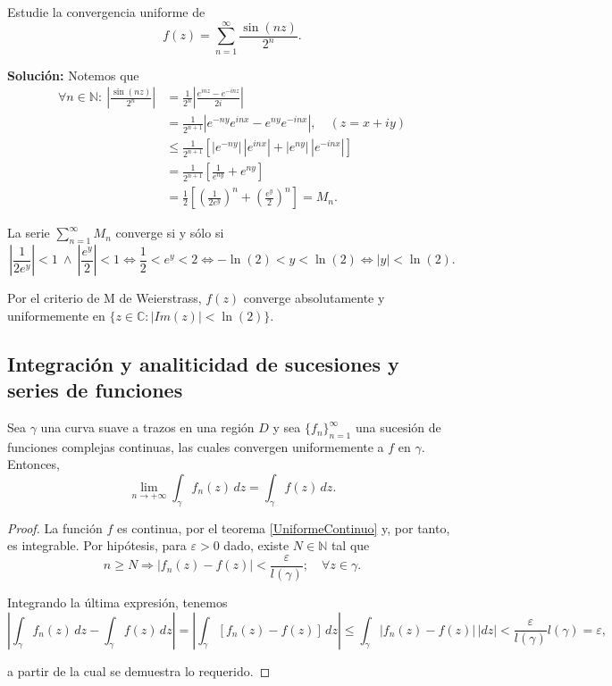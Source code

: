 \begin{ejemplo}
Estudie la convergencia uniforme de 
$$f(z) = \sum_{n=1}^{\infty} \frac{\sin(nz)}{2^n}.$$

\textbf{Solución:} Notemos que
\begin{align*}
    \forall n \in \mathbb{N}: ~ \left|\frac{\sin(nz)}{2^n} \right| &= \frac{1}{2^n} \left| \frac{e^{inz} - e^{-inz}}{2i} \right| \\
    &= \frac{1}{2^{n+1}} \left| e^{-ny} e^{inx} - e^{ny} e^{-inx}\right|, \quad (z = x+iy) \\
    &\leq \frac{1}{2^{n+1}} \left[ |e^{-ny}| \,|e^{inx}| + |e^{ny}| \,|e^{-inx}| \right] \\
    &= \frac{1}{2^{n+1}} \left[ \frac{1}{e^{ny}} + e^{ny} \right] \\
    &= \frac{1}{2} \left[ \left( \frac{1}{2e^{y}}\right)^n +  \left( \frac{e^y}{2}\right)^n \right] = M_n.
\end{align*}

La serie $\sum\limits_{n=1}^{\infty} M_n$ converge si y sólo si
$$\left|\frac{1}{2e^y}\right| < 1 ~\wedge~ \left|\frac{e^y}{2}\right|<1  \Leftrightarrow \frac{1}{2} < e^y < 2 \Leftrightarrow - \ln(2) < y < \ln(2) \Leftrightarrow |y| < \ln(2).$$

Por el criterio de M de Weierstrass, $f(z)$ converge absolutamente y uniformemente en $\{z \in \mathbb{C} : |Im(z)| < \ln(2)\}$.
\end{ejemplo}

\subsection*{Integración y analiticidad de sucesiones y series de funciones}

\begin{teorema} \label{IntegracionUniforme}
Sea $\gamma$ una curva suave a trazos en una región $D$ y sea $\{f_n\}_{n=1}^{\infty}$ una sucesión de funciones complejas continuas, las cuales convergen uniformemente a $f$ en $\gamma$. Entonces,
$$\lim_{n\to + \infty} \int_{\gamma} f_n(z) \,dz = \int_{\gamma} f(z) \,dz.$$
\end{teorema}

\begin{proof}
La función $f$ es continua, por el teorema \ref{UniformeContinuo} y, por tanto, es integrable. Por hipótesis, para $\varepsilon > 0$ dado, existe $N \in \mathbb{N}$ tal que
$$n \geq N \Rightarrow \left| f_n(z) - f(z)\right| < \frac{\varepsilon}{l(\gamma)};\quad \forall z \in \gamma.$$

Integrando la última expresión, tenemos 
$$\left| \int_{\gamma} f_n(z) \,dz - \int_{\gamma} f(z) \, dz\right| = \left| \int_{\gamma} [f_n(z) - f(z)] \,dz\right| \leq \int_{\gamma} |f_n(z) - f(z)| \,|dz| < \frac{\varepsilon}{l(\gamma)} l(\gamma) =\varepsilon,$$

a partir de la cual se demuestra lo requerido.
\end{proof}

